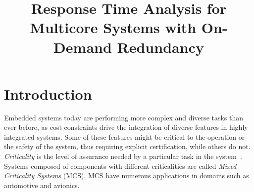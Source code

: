 \documentclass[conference]{IEEEtran}
\begin{document}
%
\title{Response Time Analysis for Multicore Systems with On-Demand Redundancy}





%
\maketitle


\begin{abstract}

\end{abstract}


\IEEEpeerreviewmaketitle


\section{Introduction}
\label{sec:introduction}
	
Embedded systems today are performing more complex and diverse tasks than ever before, as cost constraints drive the integration of diverse features in highly integrated systems. Some of these features might be critical to the operation or the safety of the system, thus requiring explicit certification, while others do not. \emph{Criticality} is the level of assurance needed by a particular task in the system~\cite{burns2013mixed}. Systems composed of components with different criticalities are called {\it Mixed Criticality Systems} (MCS). MCS have numerous applications in domains such as automotive and avionics.
	
\end{document}
